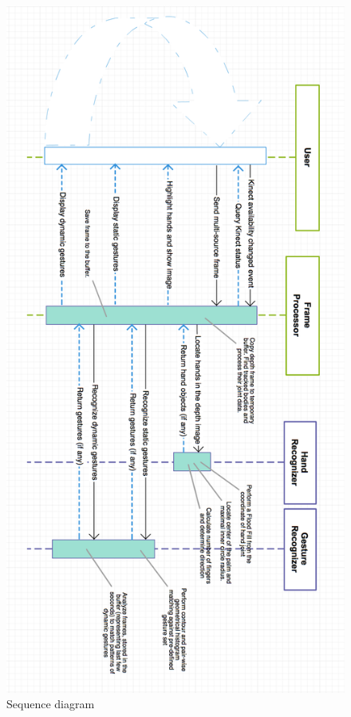 \documentclass[a4paper,11pt,oneside]{article}
\begin{document}
 \begin{figure}[H]
  \centering
  \includegraphics[scale=0.55]{sequence-dia.png}
  \caption{Sequence diagram}
  \end{figure}

  \renewcommand{\refname}{\section{References}}
  
  
  
\end{document}
